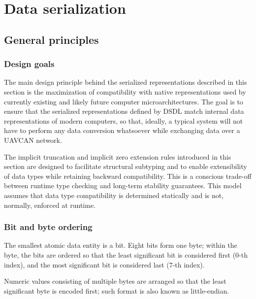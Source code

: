 \section{Data serialization}\label{sec:dsdl_data_serialization}

\newcommand{\hugett}[1]{\texttt{\huge{#1}}}

\subsection{General principles}

\subsubsection{Design goals}

The main design principle behind the serialized representations described in this section is
the maximization of compatibility with native representations used by currently existing and
likely future computer microarchitectures.
The goal is to ensure that the serialized representations defined by DSDL match internal data representations of
modern computers, so that, ideally, a typical system will not have to perform any data conversion whatsoever while
exchanging data over a UAVCAN network.

The implicit truncation and implicit zero extension rules introduced in this section are designed to
facilitate structural subtyping and to enable extensibility of data types while retaining backward compatibility.
This is a conscious trade-off between runtime type checking and long-term stability guarantees.
This model assumes that data type compatibility is determined statically and is not, normally, enforced at runtime.

\subsubsection{Bit and byte ordering}

The smallest atomic data entity is a bit.
Eight bits form one byte;
within the byte, the bits are ordered so that the least significant bit is considered first (0-th index),
and the most significant bit is considered last (7-th index).

Numeric values consisting of multiple bytes are arranged so that the least significant byte is encoded first;
such format is also known as little-endian.

